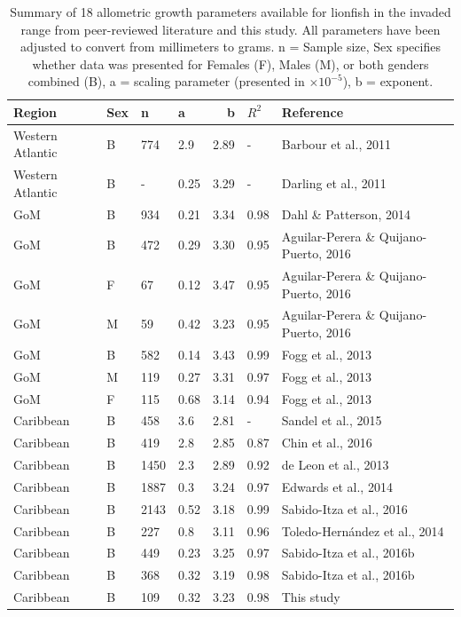 \documentclass[fleqn,10pt,lineno]{wlpeerj} %
\begin{document}
\begin{table}[t]

\caption{\label{tab:unnamed-chunk-7}\label{tab:all_params}Summary of 18 allometric growth parameters available for lionfish in the invaded range from peer-reviewed literature and this study. All parameters have been adjusted to convert from millimeters to grams. n = Sample size, Sex specifies whether data was presented for Females (F), Males (M), or both genders combined (B), a = scaling parameter (presented in $\times 10^{-5}$), b = exponent.}
\centering
\begin{tabular}{llllrll}
\toprule
Region & Sex & n & a & b & $R^2$ & Reference\\
\midrule
Western Atlantic & B & 774 & 2.9 & 2.89 & - & Barbour et al., 2011\\
Western Atlantic & B & - & 0.25 & 3.29 & - & Darling et al., 2011\\
GoM & B & 934 & 0.21 & 3.34 & 0.98 & Dahl \& Patterson, 2014\\
GoM & B & 472 & 0.29 & 3.30 & 0.95 & Aguilar-Perera \& Quijano-Puerto, 2016\\
GoM & F & 67 & 0.12 & 3.47 & 0.95 & Aguilar-Perera \& Quijano-Puerto, 2016\\
\addlinespace
GoM & M & 59 & 0.42 & 3.23 & 0.95 & Aguilar-Perera \& Quijano-Puerto, 2016\\
GoM & B & 582 & 0.14 & 3.43 & 0.99 & Fogg et al., 2013\\
GoM & M & 119 & 0.27 & 3.31 & 0.97 & Fogg et al., 2013\\
GoM & F & 115 & 0.68 & 3.14 & 0.94 & Fogg et al., 2013\\
Caribbean & B & 458 & 3.6 & 2.81 & - & Sandel et al., 2015\\
\addlinespace
Caribbean & B & 419 & 2.8 & 2.85 & 0.87 & Chin et al., 2016\\
Caribbean & B & 1450 & 2.3 & 2.89 & 0.92 & de Leon et al., 2013\\
Caribbean & B & 1887 & 0.3 & 3.24 & 0.97 & Edwards et al., 2014\\
Caribbean & B & 2143 & 0.52 & 3.18 & 0.99 & Sabido-Itza et al., 2016\\
Caribbean & B & 227 & 0.8 & 3.11 & 0.96 & Toledo-Hernández et al., 2014\\
\addlinespace
Caribbean & B & 449 & 0.23 & 3.25 & 0.97 & Sabido-Itza et al., 2016b\\
Caribbean & B & 368 & 0.32 & 3.19 & 0.98 & Sabido-Itza et al., 2016b\\
Caribbean & B & 109 & 0.32 & 3.23 & 0.98 & This study\\
\bottomrule
\end{tabular}
\end{table}
\end{document}
